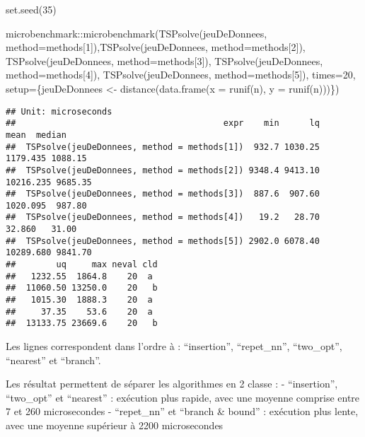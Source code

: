 \documentclass[
]{article}
\newenvironment{Shaded}{\begin{snugshade}}{\end{snugshade}}
\newcommand{\AttributeTok}[1]{\textcolor[rgb]{0.77,0.63,0.00}{#1}}
\newcommand{\DecValTok}[1]{\textcolor[rgb]{0.00,0.00,0.81}{#1}}
\newcommand{\FunctionTok}[1]{\textcolor[rgb]{0.00,0.00,0.00}{#1}}
\newcommand{\NormalTok}[1]{#1}
\newcommand{\OtherTok}[1]{\textcolor[rgb]{0.56,0.35,0.01}{#1}}
\newcommand{\SpecialCharTok}[1]{\textcolor[rgb]{0.00,0.00,0.00}{#1}}
\begin{document}
\begin{Shaded}
\begin{Highlighting}[]
\FunctionTok{set.seed}\NormalTok{(}\DecValTok{35}\NormalTok{)}

\NormalTok{microbenchmark}\SpecialCharTok{::}\FunctionTok{microbenchmark}\NormalTok{(}\FunctionTok{TSPsolve}\NormalTok{(jeuDeDonnees, }\AttributeTok{method=}\NormalTok{methods[}\DecValTok{1}\NormalTok{]),}\FunctionTok{TSPsolve}\NormalTok{(jeuDeDonnees, }\AttributeTok{method=}\NormalTok{methods[}\DecValTok{2}\NormalTok{]), }\FunctionTok{TSPsolve}\NormalTok{(jeuDeDonnees, }\AttributeTok{method=}\NormalTok{methods[}\DecValTok{3}\NormalTok{]), }\FunctionTok{TSPsolve}\NormalTok{(jeuDeDonnees, }\AttributeTok{method=}\NormalTok{methods[}\DecValTok{4}\NormalTok{]), }\FunctionTok{TSPsolve}\NormalTok{(jeuDeDonnees, }\AttributeTok{method=}\NormalTok{methods[}\DecValTok{5}\NormalTok{]), }\AttributeTok{times=}\DecValTok{20}\NormalTok{, }\AttributeTok{setup=}\NormalTok{\{jeuDeDonnees }\OtherTok{\textless{}{-}} \FunctionTok{distance}\NormalTok{(}\FunctionTok{data.frame}\NormalTok{(}\AttributeTok{x =} \FunctionTok{runif}\NormalTok{(n), }\AttributeTok{y =} \FunctionTok{runif}\NormalTok{(n)))\})}
\end{Highlighting}
\end{Shaded}

\begin{verbatim}
## Unit: microseconds
##                                         expr    min      lq      mean  median
##  TSPsolve(jeuDeDonnees, method = methods[1])  932.7 1030.25  1179.435 1088.15
##  TSPsolve(jeuDeDonnees, method = methods[2]) 9348.4 9413.10 10216.235 9685.35
##  TSPsolve(jeuDeDonnees, method = methods[3])  887.6  907.60  1020.095  987.80
##  TSPsolve(jeuDeDonnees, method = methods[4])   19.2   28.70    32.860   31.00
##  TSPsolve(jeuDeDonnees, method = methods[5]) 2902.0 6078.40 10289.680 9841.70
##        uq     max neval cld
##   1232.55  1864.8    20  a 
##  11060.50 13250.0    20   b
##   1015.30  1888.3    20  a 
##     37.35    53.6    20  a 
##  13133.75 23669.6    20   b
\end{verbatim}

Les lignes correspondent dans l'ordre à : ``insertion'', ``repet\_nn'',
``two\_opt'', ``nearest'' et ``branch''.

Les résultat permettent de séparer les algorithmes en 2 classe : -
``insertion'', ``two\_opt'' et ``nearest'' : exécution plus rapide, avec
une moyenne comprise entre 7 et 260 microsecondes - ``repet\_nn'' et
``branch \& bound'' : exécution plus lente, avec une moyenne supérieur à
2200 microsecondes
\end{document}
